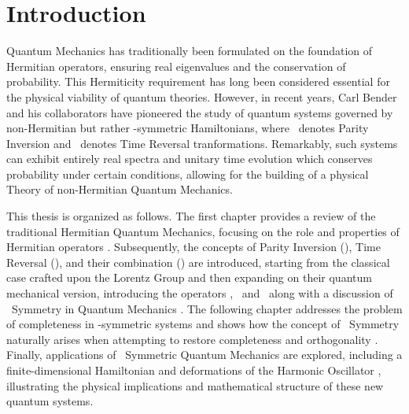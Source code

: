 \chapter{Introduction}\label{ch:introduction}
    Quantum Mechanics has traditionally been formulated on the foundation of Hermitian operators, ensuring real eigenvalues and the conservation of probability. This Hermiticity requirement has long been considered essential for the physical viability of quantum theories. However, in recent years, Carl Bender and his collaborators have pioneered the study of quantum systems governed by non-Hermitian but rather \PT-symmetric Hamiltonians, where \mcP\ denotes Parity Inversion and \mcT\ denotes Time Reversal tranformations. Remarkably, such systems can exhibit entirely real spectra and unitary time evolution which conserves probability under certain conditions, allowing for the building of a physical Theory of non-Hermitian Quantum Mechanics.

    This thesis is organized as follows. The first chapter provides a review of the traditional Hermitian Quantum Mechanics, focusing on the role and properties of Hermitian operators \cite{Shankar2012-kg,Sakurai2020-pu,Bernardini1993-iy}. Subsequently, the concepts of Parity Inversion (\mcP), Time Reversal (\mcT), and their combination (\PT) are introduced, starting from the classical case crafted upon the Lorentz Group \cite{bender2024} and then expanding on their quantum mechanical version, introducing the operators \hP, \hT\ and \hPT\ along with a discussion of \PT\ Symmetry in Quantum Mechanics \cite{Bender2005,bender2024}. The following chapter addresses the problem of completeness in \PT-symmetric systems and shows how the concept of \CPT\ Symmetry naturally arises when attempting to restore completeness and orthogonality \cite{Bender2007,bender2024,Weigert2003}. Finally, applications of \PT\ Symmetric Quantum Mechanics are explored, including a finite-dimensional Hamiltonian and deformations of the Harmonic Oscillator \cite{Bender1998}, illustrating the physical implications and mathematical structure of these new quantum systems.